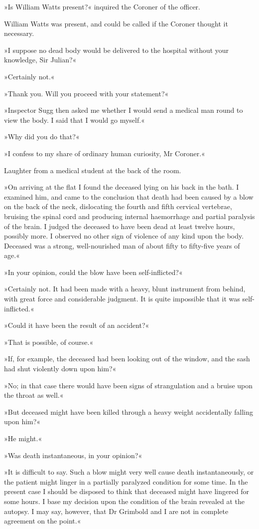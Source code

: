 »Is William Watts present?« inquired the Coroner of the officer.

William Watts was present, and could be called if the Coroner thought it necessary.

»I suppose no dead body would be delivered to the hospital without your knowledge, Sir Julian?«

»Certainly not.«

»Thank you. Will you proceed with your statement?«

»Inspector Sugg then asked me whether I would send a medical man round to view the body. I said that I would go myself.«

»Why did you do that?«

»I confess to my share of ordinary human curiosity, Mr Coroner.«

Laughter from a medical student at the back of the room.

»On arriving at the flat I found the deceased lying on his back in the bath. I examined him, and came to the conclusion that death had been caused by a blow on the back of the neck, dislocating the fourth and fifth cervical vertebrae, bruising the spinal cord and producing internal haemorrhage and partial paralysis of the brain. I judged the deceased to have been dead at least twelve hours, possibly more. I observed no other sign of violence of any kind upon the body. Deceased was a strong, well-nourished man of about fifty to fifty-five years of age.«

»In your opinion, could the blow have been self-inflicted?«

»Certainly not. It had been made with a heavy, blunt instrument from behind, with great force and considerable judgment. It is quite impossible that it was self-inflicted.«

»Could it have been the result of an accident?«

»That is possible, of course.«

»If, for example, the deceased had been looking out of the window, and the sash had shut violently down upon him?«

»No; in that case there would have been signs of strangulation and a bruise upon the throat as well.«

»But deceased might have been killed through a heavy weight accidentally falling upon him?«

»He might.«

»Was death instantaneous, in your opinion?«

»It is difficult to say. Such a blow might very well cause death instantaneously, or the patient might linger in a partially paralyzed condition for some time. In the present case I should be disposed to think that deceased might have lingered for some hours. I base my decision upon the condition of the brain revealed at the autopsy. I may say, however, that Dr Grimbold and I are not in complete agreement on the point.«

